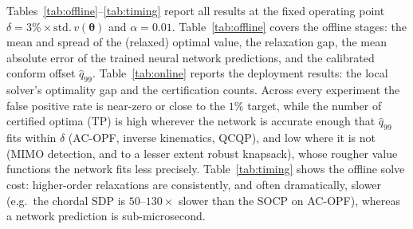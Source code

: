 \documentclass[10pt]{article} %
\theoremstyle{plain}
\theoremstyle{definition}
\theoremstyle{remark}
\begin{document}
Tables~\ref{tab:offline}--\ref{tab:timing} report all results at the fixed operating point $\delta = 3\% \times\mathrm{std.\,}v(\bm{\theta})$ and $\alpha = 0.01$. Table~\ref{tab:offline} covers the offline stages: the mean and spread of the (relaxed) optimal value, the relaxation gap, the mean absolute error of the trained neural network predictions, and the calibrated conform offset $\hat{q}_{99}$. Table~\ref{tab:online} reports the deployment results: the local solver's optimality gap and the certification counts. Across every experiment the false positive rate is near-zero or close to the $1\%$ target, while the number of certified optima (TP) is high wherever the network is accurate enough that $\hat{q}_{99}$ fits within $\delta$ (AC-OPF, inverse kinematics, QCQP), and low where it is not (MIMO detection, and to a lesser extent robust knapsack), whose rougher value functions the network fits less precisely. Table~\ref{tab:timing} shows the offline solve cost: higher-order relaxations are consistently, and often dramatically, slower (e.g.\ the chordal SDP is $50$--$130\times$ slower than the SOCP on AC-OPF), whereas a network prediction is sub-microsecond.
\end{document}
